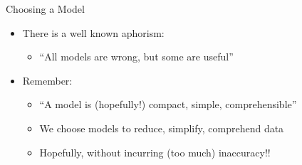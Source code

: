 \documentclass[aspectratio=169]{beamer}
\begin{document}

\begin{frame}{Choosing a Model}

\begin{itemize}
\item There is a well known aphorism:
	\begin{itemize}
	\item ``All models are wrong, but some are useful''
	\end{itemize}	
\item Remember:
	\begin{itemize}
	\item ``A model is (hopefully!) compact, simple, comprehensible''
	\item We choose models to reduce, simplify, comprehend data
	\item Hopefully, without incurring (too much) inaccuracy!!
	\end{itemize}
\end{itemize}
\end{frame}
\end{document}
